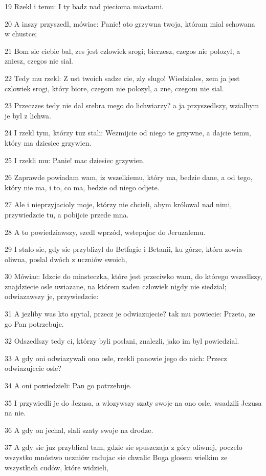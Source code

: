\par 19 Rzekl i temu: I ty badz nad piecioma miastami.
\par 20 A inszy przyszedl, mówiac: Panie! oto grzywna twoja, któram mial schowana w chustce;
\par 21 Bom sie ciebie bal, zes jest czlowiek srogi; bierzesz, czegos nie polozyl, a zniesz, czegos nie sial.
\par 22 Tedy mu rzekl: Z ust twoich sadze cie, zly slugo! Wiedziales, zem ja jest czlowiek srogi, który biore, czegom nie polozyl, a zne, czegom nie sial.
\par 23 Przeczzes tedy nie dal srebra mego do lichwiarzy? a ja przyszedlszy, wzialbym je byl z lichwa.
\par 24 I rzekl tym, którzy tuz stali: Wezmijcie od niego te grzywne, a dajcie temu, który ma dziesiec grzywien.
\par 25 I rzekli mu: Panie! mac dziesiec grzywien.
\par 26 Zaprawde powiadam wam, iz wszelkiemu, który ma, bedzie dane, a od tego, który nie ma, i to, co ma, bedzie od niego odjete.
\par 27 Ale i nieprzyjacioly moje, którzy nie chcieli, abym królowal nad nimi, przywiedzcie tu, a pobijcie przede mna.
\par 28 A to powiedziawszy, szedl wprzód, wstepujac do Jeruzalemu.
\par 29 I stalo sie, gdy sie przyblizyl do Betfagie i Betanii, ku górze, która zowia oliwna, poslal dwóch z uczniów swoich,
\par 30 Mówiac: Idzcie do miasteczka, które jest przeciwko wam, do którego wszedlszy, znajdziecie osle uwiazane, na którem zaden czlowiek nigdy nie siedzial; odwiazawszy je, przywiedzcie:
\par 31 A jezliby was kto spytal, przecz je odwiazujecie? tak mu powiecie: Przeto, ze go Pan potrzebuje.
\par 32 Odszedlszy tedy ci, którzy byli poslani, znalezli, jako im byl powiedzial.
\par 33 A gdy oni odwiazywali ono osle, rzekli panowie jego do nich: Przecz odwiazujecie osle?
\par 34 A oni powiedzieli: Pan go potrzebuje.
\par 35 I przywiedli je do Jezusa, a wlozywszy szaty swoje na ono osle, wsadzili Jezusa na nie.
\par 36 A gdy on jechal, slali szaty swoje na drodze.
\par 37 A gdy sie juz przyblizal tam, gdzie sie spuszczaja z góry oliwnej, poczelo wszystko mnóstwo uczniów radujac sie chwalic Boga glosem wielkim ze wszystkich cudów, które widzieli,
